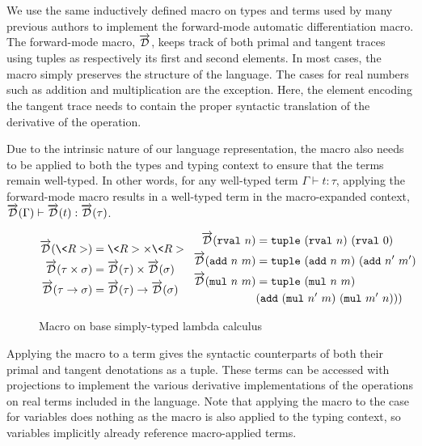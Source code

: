   We use the same inductively defined macro on types and terms used by many previous authors to implement the forward-mode automatic differentiation macro\cite{huot2020correctness}\cite{barthe2020versatility}\cite{Shaikha2019}.
  The forward-mode macro, $\overrightarrow{\mathcal{D}}$, keeps track of both primal and tangent traces using tuples as respectively its first and second elements.
  In most cases, the macro simply preserves the structure of the language.
  The cases for real numbers such as addition and multiplication are the exception.
  Here, the element encoding the tangent trace needs to contain the proper syntactic translation of the derivative of the operation.

  Due to the intrinsic nature of our language representation, the macro also needs to be applied to both the types and typing context to ensure that the terms remain well-typed.
  In other words, for any well-typed term $\Gamma \vdash t : \tau$, applying the forward-mode macro results in a well-typed term in the macro-expanded context, $\overrightarrow{\mathcal{D}}(\Gamma) \vdash \overrightarrow{\mathcal{D}}(t) : \overrightarrow{\mathcal{D}}(\tau)$.

  \begin{figure}[H]
    \centering
    \begin{equation*}
      \begin{split}
        \D(\<R>) &= \<R> \times \<R> \\
        \D(\tau \times \sigma) &= \D(\tau) \times \D(\sigma) \\
        \D(\tau \rightarrow \sigma) &= \D(\tau) \rightarrow \D(\sigma)
      \end{split}
      \;\;\;
      \begin{split}
        \D(\rval{n}) &= \tuple{(\rval{n})}{(\rval{0})} \\
        \D(\add{n}{m}) &= \tuple{(\add{n}{m})}{(\add{n'}{m'})} \\
        \D(\mul{n}{m}) &= \tuple{(\mul{n}{m})} \\
          &{(\add{(\mul{n'}{m})}{(\mul{m'}{n})})})
      \end{split}
    \end{equation*}
    \caption{Macro on base simply-typed lambda calculus}
    \label{eqn:macro_base}
  \end{figure}

  Applying the macro to a term gives the syntactic counterparts of both their primal and tangent denotations as a tuple.
  These terms can be accessed with projections to implement the various derivative implementations of the operations on real terms included in the language.
  Note that applying the macro to the case for variables does nothing as the macro is also applied to the typing context, so variables implicitly already reference macro-applied terms.

